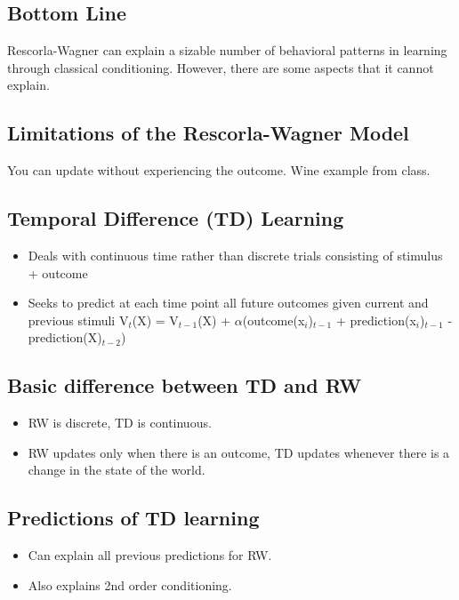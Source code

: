 \subsection{Bottom Line}
Rescorla-Wagner can explain a sizable number of behavioral patterns in learning through
classical conditioning. However, there are some aspects that it cannot explain.

\subsection{Limitations of the Rescorla-Wagner Model}
You can update without experiencing the outcome. Wine example from class.

\subsection{Temporal Difference (TD) Learning}
\begin{itemize}
    \item Deals with continuous time rather than discrete trials consisting of stimulus + outcome
    \item Seeks to predict at each time point all future outcomes given current and previous stimuli
    V$_{t}$(X) = V$_{t-1}$(X) + $\alpha$(outcome(x$_{i}$)$_{t-1}$ + prediction(x$_{i}$)$_{t-1}$ - prediction(X)$_{t-2}$)
\end{itemize}

\subsection{Basic difference between TD and RW}
\begin{itemize}
    \item RW is discrete, TD is continuous.
    \item RW updates only when there is an outcome, TD updates whenever there is a change in the state of the world.
\end{itemize}

\subsection{Predictions of TD learning}
\begin{itemize}
    \item Can explain all previous predictions for RW.
    \item Also explains 2nd order conditioning.
\end{itemize}

